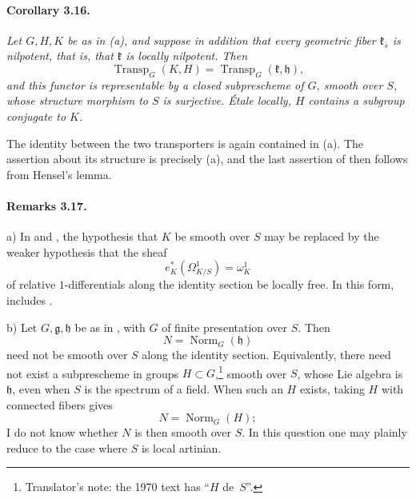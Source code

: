 
\paragraph{\textbf{Corollary 3.16.}}
{\itshape Let \(G,H,K\) be as in \textup{(a)}, and suppose in
addition that every geometric fiber \(\mathfrak k_{\bar s}\) is
nilpotent, that is, that \(\mathfrak k\) is locally nilpotent. Then
\[
  \operatorname{Transp}_G(K,H)
  =
  \operatorname{Transp}_G(\mathfrak k,\mathfrak h),
\]
and this functor is representable by a closed subprescheme of
\(G\), smooth over \(S\), whose structure morphism to \(S\) is
surjective. Étale locally, \(H\) contains a subgroup conjugate to
\(K\).}

The identity between the two transporters is again contained in
\textup{(a)}. The assertion about its structure is precisely
\textup{(a)}, and the last assertion of  then follows from
Hensel's lemma.

\paragraph{\textbf{Remarks 3.17.}}
\textup{a)}
In  and , the hypothesis that \(K\) be smooth over \(S\)
may be replaced by the weaker hypothesis that the sheaf
\[
  e_K^*(\Omega^1_{K/S})=\omega^1_K
\]
of relative \(1\)-differentials along the identity section be
locally free. In this form,  includes .

\smallskip
\noindent
\textup{b)}
Let \(G,\mathfrak g,\mathfrak h\) be as in , with \(G\) of
finite presentation over \(S\). Then
\[
  N=\operatorname{Norm}_G(\mathfrak h)
\]
need not be smooth over \(S\) along the identity section.
Equivalently, there need not exist a subprescheme in groups
\(H\subset G\),\footnote{Translator's note: the 1970 text has ``\(H\) de~\(S\)''.} smooth over \(S\), whose Lie algebra is
\(\mathfrak h\), even when \(S\) is the spectrum of a field. When
such an \(H\) exists, taking \(H\) with connected fibers gives
\[
  N=\operatorname{Norm}_G(H);
\]
I do not know whether \(N\) is then smooth over \(S\). In this
question one may plainly reduce to the case where \(S\) is local
artinian.
